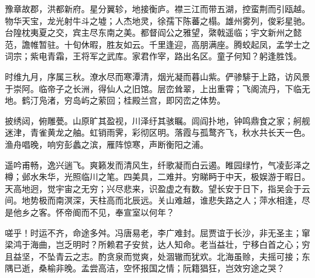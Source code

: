 \begin{abstractOriginal}
豫章故郡，洪都新府。星分翼轸，地接衡庐。襟三江而带五湖，控蛮荆而引瓯越。物华天宝，龙光射牛斗之墟；人杰地灵，徐孺下陈蕃之榻。雄州雾列，俊彩星驰。台隍枕夷夏之交，宾主尽东南之美。都督阎公之雅望，綮戟遥临；宇文新州之懿范，譫帷暂驻。十旬休暇，胜友如云。千里逢迎，高朋满座。腾蛟起凤，孟学士之词宗；紫电青霜，王将军之武库。家君作宰，路出名区。童子何知？躬逢胜饯。

时维九月，序属三秋。潦水尽而寒潭清，烟光凝而暮山紫。俨骖騑于上路，访风景于崇阿。临帝子之长洲，得仙人之旧馆。层峦耸翠，上出重霄；飞阁流丹，下临无地。鹤汀凫渚，穷岛屿之萦回；桂殿兰宫，即冈峦之体势。

披绣闼，俯雕甍。山原旷其盈视，川泽纡其骇瞩。闾阎扑地，钟鸣鼎食之家；舸舰迷津，青雀黄龙之舳。虹销雨霁，彩彻区明。落霞与孤鹜齐飞，秋水共长天一色。渔舟唱晚，响穷彭蠡之滨，雁阵惊寒，声断衡阳之浦。

遥吟甫畅，逸兴遄飞。爽籁发而清风生，纤歌凝而白云遏。睢园绿竹，气凌彭泽之樽；邺水朱华，光照临川之笔。四美具，二难并。穷睇眄于中天，极娱游于暇日。天高地迥，觉宇宙之无穷；兴尽悲来，识盈虚之有数。望长安于日下，指吴会于云间。地势极而南溟深，天柱高而北辰远。关山难越，谁悲失路之人；萍水相逢，尽是他乡之客。怀帝阍而不见，奉宣室以何年？

嗟乎！时运不齐，命途多舛。冯唐易老，李广难封。屈贾谊于长沙，非无圣主；窜梁鸿于海曲，岂乏明时？所赖君子安贫，达人知命。老当益壮，宁移白首之心；穷且益坚，不坠青云之志。酌贪泉而觉爽，处涸辙而犹欢。北海虽赊，夫摇可接；东隅已逝，桑榆非晚。孟尝高洁，空怀报国之情；阮籍猖狂，岂效穷途之哭？

\end{abstractOriginal}

